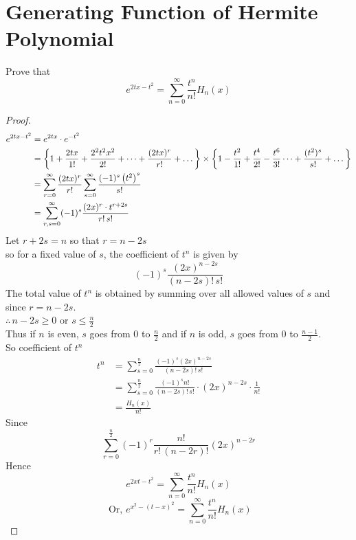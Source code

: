 \documentclass[../main-sheet.tex]{subfiles}
\begin{document}
\section{Generating Function of Hermite Polynomial}
\begin{prob}
    Prove that
    \[
        e^{2tx-t^2}=\sum_{n=0}^\infty\frac{t^n}{n!}H_n(x)
    \]
\end{prob}
\begin{proof}
    \begin{align}
        e^{2tx-t^2} & =e^{2tx}\cdot e^{-t^2}\notag                                                                                                                                                                     \\
                    & = \left\{ 1+\frac{2tx}{1!}+\frac{2^2t^2x^2}{2!}+\dots+\frac{(2tx)^r}{r!}+\dots\right\}\times \left\{ 1-\frac{t^2}{1!}+\frac{t^4}{2!}-\frac{t^6}{3!}\dots+\frac{(t^2)^s}{s!}+\dots \right\}\notag \\
                    & = \sum_{r=0}^\infty \frac{(2tx)^r}{r!}\sum_{s=0}^\infty\frac{(-1)^s\left( t^2 \right)^s}{s!}\notag                                                                                               \\
                    & = \sum_{r,s=0}^\infty (-1)^s \frac{(2x)^r\cdot t^{r+2s}}{r!\,s!}\notag %
    \end{align}
    Let \( r+2s=n \) so that \( r=n-2s \)\\
    so for a fixed value of \( s \), the coefficient of \( t^n \) is given by
    \[
        (-1)^s\frac{(2x)^{n-2s}}{(n-2s)!\,s!}
    \]
    The total value of \( t^n \) is obtained by summing over all allowed values of \( s \) and since \( r=n-2s \).\\
    \( \therefore\,n-2s\geq0 \) or \( s\leq \frac{n}{2} \)\\
    Thus if \( n \) is even, \( s \) goes from \( 0 \) to \( \frac{n}{2} \) and if \( n \) is odd, \( s \) goes from \( 0  \) to \( \frac{n-1}{2} \).\\
    So coefficient of \( t^n \)
    \begin{align*}
        t^n & = \sum_{s=0}^\frac{n}{2} \frac{(-1)^s(2x)^{n-2s}}{(n-2s)!\,s!}                          \\
            & = \sum_{s=0}^\frac{n}{2} \frac{(-1)^s n!}{(n-2s)!\,s!}\cdot(2x)^{n-2s}\cdot\frac{1}{n!} \\
            & =\frac{H_n(x)}{n!}
    \end{align*}
    Since 
    \[
        \sum_{r=0}^{\frac{n}{2}} (-1)^r \frac{n!}{r!\,(n-2r)!}(2x)^{n-2r}
    \]
    Hence 
    \[
        e^{2xt-t^2}=\sum_{n=0}^\infty \frac{t^n}{n!}H_n(x)
    \]
    \[
        \text{ Or,  }e^{x^2-(t-x)^2}=\sum_{n=0}^\infty \frac{t^n}{n!}H_n(x)
    \]
\end{proof}
\end{document}
